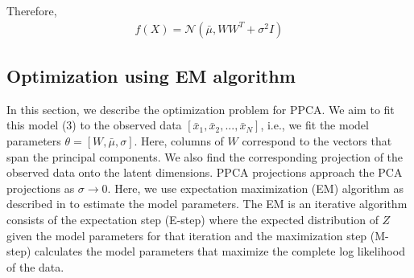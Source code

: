 Therefore, 
\begin{align}
	f(X) = \mathcal{N}(\bar{\mu}, WW^T + \sigma^2I) 
\end{align} 

\subsection{Optimization using EM algorithm}

In this section, we describe the optimization problem for PPCA. We aim to fit this model (3) to the observed data $[\bar{x}_1, \bar{x}_2, ...,\bar{x}_N]$, i.e., we fit the model parameters $\theta = [W, \bar{\mu}, \sigma]$. Here, columns of $W$ correspond to the vectors that span the principal components. We also find the corresponding projection of the observed data onto the latent dimensions. PPCA projections approach the PCA projections as $\sigma \rightarrow 0$. Here, we use expectation maximization (EM) algorithm as described in \cite{tipping1999probabilistic} to estimate the model parameters. The EM is an iterative algorithm consists of the expectation step (E-step) where the expected distribution of $Z$ given the model parameters for that iteration and the maximization step (M-step) calculates the model parameters that maximize the complete log likelihood of the data. 

